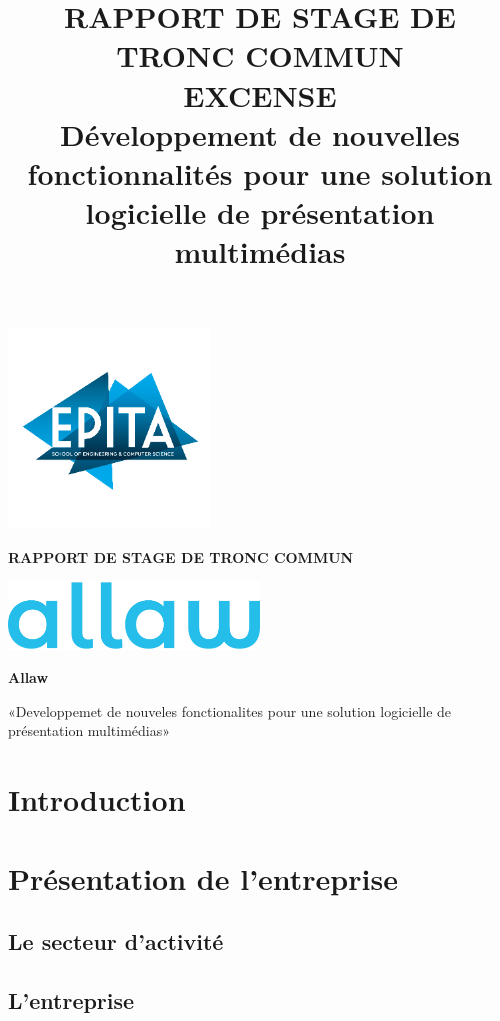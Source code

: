 \documentclass[12pt,a4paper]{report}
\title{RAPPORT DE STAGE DE TRONC COMMUN\\
       \large{EXCENSE}\\
       \large{Développement de nouvelles fonctionnalités pour une solution logicielle de présentation multimédias}}
\date{}
\begin{document}
\begin{titlepage}
\begin{center}
\includegraphics[width=0.4\textwidth]{media/image1.png}

\vspace{1cm}
{\huge\bfseries RAPPORT DE STAGE DE TRONC COMMUN\par}
\vspace{1cm}

\includegraphics[width=0.5\textwidth]{media/allaw.png}

\vspace{1.5cm}
{\Large\bfseries Allaw\par}
\vspace{0.5cm}
{\large «Developpemet de nouveles fonctionalites pour une solution logicielle de présentation multimédias»\par}
\end{center}
\end{titlepage}

\tableofcontents
\newpage

\chapter{Introduction}


\chapter{Présentation de l'entreprise}
\section{Le secteur d'activité}

\section{L'entreprise}
\end{document}
